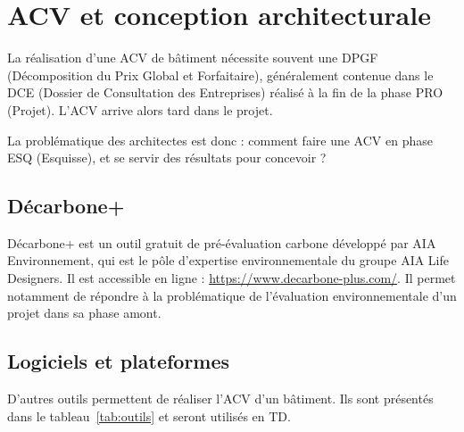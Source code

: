 \chapter{ACV et conception architecturale}

La réalisation d'une ACV de bâtiment nécessite souvent une DPGF (Décomposition du Prix Global et Forfaitaire), généralement contenue dans le DCE (Dossier de Consultation des Entreprises) réalisé à la fin de la phase PRO (Projet). L'ACV arrive alors tard dans le projet.

La problématique des architectes est donc : comment faire une ACV en phase ESQ (Esquisse), et se servir des résultats pour concevoir ?

\label{chap:outils}

\section{Décarbone+}

Décarbone+ est un outil gratuit de pré-évaluation carbone développé par AIA Environnement, qui est le pôle d'expertise environnementale du groupe AIA Life Designers. Il est accessible en ligne : \url{https://www.decarbone-plus.com/}.
Il permet notamment de répondre à la problématique de l'évaluation environnementale d'un projet dans sa phase amont.

\section{Logiciels et plateformes}

D'autres outils permettent de réaliser l'ACV d'un bâtiment. Ils sont présentés dans le tableau~\ref{tab:outils} et seront utilisés en TD.

